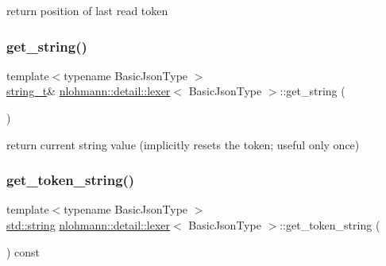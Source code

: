 return position of last read token 

\mbox{\label{classnlohmann_1_1detail_1_1lexer_a54aa290ff2f60218a8f35f1ebf81666d}} 
\subsubsection{\texorpdfstring{get\_string()}{get\_string()}}
{\footnotesize\ttfamily template$<$typename Basic\+Json\+Type $>$ \\
\mbox{\hyperlink{classnlohmann_1_1detail_1_1lexer_ab63d35c658887592a4b09ad26eb4c795}{string\+\_\+t}}\& \mbox{\hyperlink{classnlohmann_1_1detail_1_1lexer}{nlohmann\+::detail\+::lexer}}$<$ Basic\+Json\+Type $>$\+::get\+\_\+string (\begin{DoxyParamCaption}{ }\end{DoxyParamCaption})\hspace{0.3cm}{\ttfamily [inline]}}



return current string value (implicitly resets the token; useful only once) 

\mbox{\label{classnlohmann_1_1detail_1_1lexer_a4aef7e72e539be04e139c34872421f2a}} 
\subsubsection{\texorpdfstring{get\_token\_string()}{get\_token\_string()}}
{\footnotesize\ttfamily template$<$typename Basic\+Json\+Type $>$ \\
\mbox{\hyperlink{namespacenlohmann_1_1detail_a1ed8fc6239da25abcaf681d30ace4985ab45cffe084dd3d20d928bee85e7b0f21}{std\+::string}} \mbox{\hyperlink{classnlohmann_1_1detail_1_1lexer}{nlohmann\+::detail\+::lexer}}$<$ Basic\+Json\+Type $>$\+::get\+\_\+token\+\_\+string (\begin{DoxyParamCaption}{ }\end{DoxyParamCaption}) const\hspace{0.3cm}{\ttfamily [inline]}}

